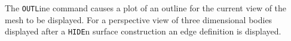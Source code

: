 \headb

The {\tt OUTL}ine command causes a plot of an outline for
the current view of the mesh to be displayed.
For a perspective view of three dimensional bodies displayed after a 
{\tt HIDE}n surface construction an edge definition is displayed.
\vfill
\eject
